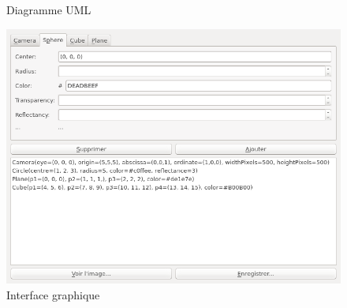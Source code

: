 \documentclass[a4paper]{article}
\begin{document}
    \begin{landscape}
      \thispagestyle{empty}
      \begin{figure}[p]
        \caption{Diagramme UML\label{fig:uml}}
      \end{figure}
    \end{landscape}
    \restoregeometry

    \begin{figure}[p]
      \centerline{\includegraphics[width=1.2\textwidth]{gui.png}}
    \caption{Interface graphique\label{fig:gui}}
    \end{figure}
\end{document}

